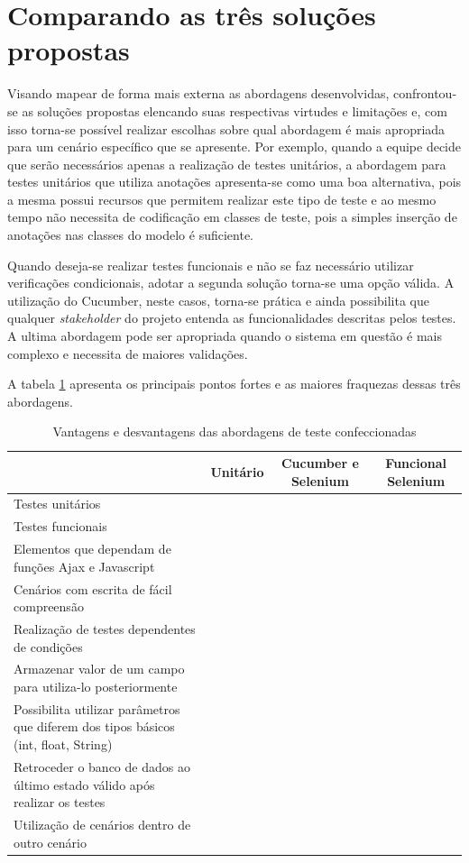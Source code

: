 \documentclass[tg]{mdtufsm}
\begin{document}
\section{Comparando as três soluções propostas}
Visando mapear de forma mais externa as abordagens desenvolvidas, confrontou-se as soluções propostas elencando suas respectivas virtudes e limitações e, com isso torna-se possível realizar escolhas sobre qual abordagem é mais apropriada para um cenário específico que se apresente.
Por exemplo, quando a equipe decide que serão necessários apenas a realização de testes unitários, a abordagem para testes unitários que utiliza anotações apresenta-se como uma boa alternativa, pois a mesma possui recursos que permitem realizar este tipo de teste e ao mesmo tempo não necessita de codificação em classes de teste, pois a simples inserção de anotações nas classes do modelo é suficiente.

Quando deseja-se realizar testes funcionais e não se faz necessário utilizar verificações condicionais, adotar a segunda solução torna-se uma opção válida. A utilização do Cucumber, neste casos, torna-se prática e ainda possibilita que qualquer \emph{stakeholder} do projeto entenda as funcionalidades descritas pelos testes.
A ultima abordagem pode ser apropriada quando o sistema em questão é mais complexo e necessita de maiores validações.

A tabela \ref{tab:comparacaoSolucoes} apresenta os principais pontos fortes e as maiores fraquezas dessas três abordagens.

\begin{table}[!htpb]
	\centering
	\begin{tabular}{p{5cm}|c|c|c}
		& Unitário & Cucumber e Selenium & Funcional Selenium\\ \hline
		Testes unitários & \checkmark & \checkmark & \checkmark \\ \hline
		Testes funcionais &  & \checkmark & \checkmark \\ \hline
		Elementos que dependam de funções Ajax e Javascript & & \checkmark & \checkmark \\ \hline
		Cenários com escrita de fácil compreensão & & \checkmark & \\ \hline
		Realização de testes dependentes de condições & & & \checkmark \\ \hline
		Armazenar valor de um campo para utiliza-lo posteriormente & & & \checkmark \\ \hline
		Possibilita utilizar parâmetros que diferem dos tipos básicos (int, float, String) & \checkmark & & \checkmark \\ \hline
		Retroceder o banco de dados ao último estado válido após realizar os testes & & & \\ \hline
		Utilização de cenários dentro de outro cenário & & & \checkmark \\ \hline
	\end{tabular}
	\caption{Vantagens e desvantagens das abordagens de teste confeccionadas}
	\label{tab:comparacaoSolucoes}
\end{table}
\end{document}
